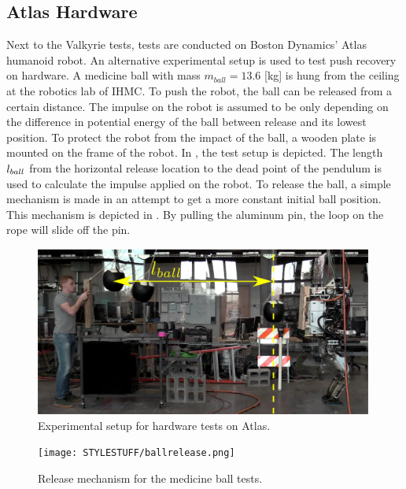 \subsection{Atlas Hardware}
Next to the Valkyrie tests, tests are conducted on Boston Dynamics' Atlas humanoid robot. An alternative experimental setup is used to test push recovery on hardware. A medicine ball with mass $m_{ball}=13.6$ [kg] is hung from the ceiling at the robotics lab of \ac{IHMC}. To push the robot, the ball can be released from a certain distance. The impulse on the robot is assumed to be only depending on the difference in potential energy of the ball between release and its lowest position. To protect the robot from the impact of the ball, a wooden plate is mounted on the frame of the robot. In , the test setup is depicted. The length $l_{ball}$ from the horizontal release location to the dead point of the pendulum is used to calculate the impulse applied on the robot. To release the ball, a simple mechanism is made in an attempt to get a more constant initial ball position. This mechanism is depicted in . By pulling the aluminum pin, the loop on the rope will slide off the pin.
\begin{figure}
\centering
\includegraphics[width=0.99\textwidth]{STYLESTUFF/atlassetup.png}
\caption{Experimental setup for hardware tests on Atlas.}
\label{fig:atlassetup}
\end{figure}
\begin{figure}
\centering
\texttt{[image: STYLESTUFF/ballrelease.png]}
\caption{Release mechanism for the medicine ball tests.}
\label{fig:ballrelease}
\end{figure}

